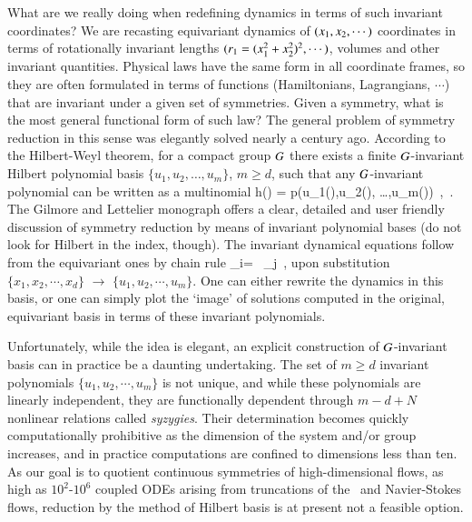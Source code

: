 \documentclass[preprint,number,sort&compress]{elsarticle}
\begin{document}
What are we really doing when redefining dynamics in terms of
such in\-vari\-ant coordinates? We are recasting
equi\-vari\-ant dynamics of $(x_1,x_2,\cdots)$
coordinates in terms of rotationally in\-vari\-ant lengths
$(r_1=(x_1^2+x_2^2)^2,\cdots)$, volumes and other
in\-vari\-ant quantities. Physical laws have the same form in
all coordinate frames, so they are often formulated in terms
of functions (Hamiltonians, Lagrangians, $\cdots$) {that are}
in\-vari\-ant under a given set of symmetries. Given a
symmetry, what is the most general functional form of such
law? The general problem of symmetry reduction in this sense
{was} elegantly solved nearly a century ago. According to the
Hilbert-Weyl theorem, for a compact group $G$ there
exists a finite $G${-in\-vari\-ant} Hilbert polynomial
basis $\{u_1,u_2, \dots,u_m\}$, $ m \geq d$, such that any
$G${-in\-vari\-ant} polynomial can be written as a
multinomial
\beq
h(\ssp) = p(u_1(\ssp),u_2(\ssp), \dots,u_m(\ssp))
    \,,\qquad \ssp \in \pS
\,.
The Gilmore and Lettelier monograph offers a
clear, detailed and user friendly discussion of symmetry
reduction by means of in\-vari\-ant polynomial bases (do not
look for Hilbert in the index, though). The in\-vari\-ant
dynamical equations follow from the equi\-vari\-ant ones by
chain rule
\beq
 _i= \, _j
 \,,
upon substitution $\{x_1,x_2,\cdots,x_d\}$ $\to$
$\{u_1,u_2,\cdots,u_m\}$. One can either rewrite the dynamics
in this basis, or one can simply plot the `image' of
solutions computed in the original, equi\-vari\-ant basis in
terms of these in\-vari\-ant polynomials.

Unfortunately, while the idea is elegant, an explicit
construction of $G${-in\-vari\-ant} basis can in
practice be a daunting undertaking. The set  of $m \geq d$
in\-vari\-ant polynomials $\{u_1,u_2,\cdots,u_m\}$ is not
unique, and while these polynomials are linearly independent,
they are functionally dependent through $m-d+N$ nonlinear
relations called \emph{syzygies}. Their determination becomes
quickly computationally prohibitive as the dimension of the
system and/or group increases,
and in practice computations are confined to
dimensions less than ten. As our goal is to quotient
continuous symmetries of high-dimensional flows, as high as
$10^2$-$10^6$ coupled ODEs arising from
truncations of the \KS\ and Navier-Stokes flows, reduction by
the method of Hilbert basis is at present not a feasible
option.
\end{document}
